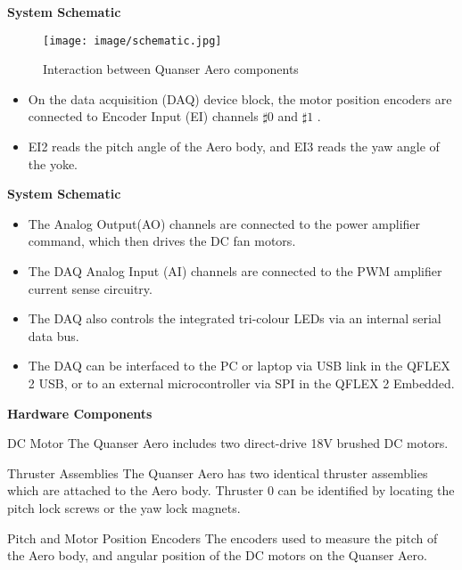 \documentclass[blue,mathserif,envcountsect,compress,10pt,xcolor=pdftex,dvipsnames,table]{beamer}
\begin{document}
\begin{frame}{\SquareShadowTopLeft \bf System Schematic}
\begin{figure}
  \centering
  \texttt{[image: image/schematic.jpg]}
  \caption{Interaction between Quanser Aero components}\label{schematic}
\end{figure}

\begin{itemize}
  \item On the data acquisition (DAQ) device block, the motor position encoders are connected to Encoder Input (EI) channels $\sharp 0$ and $\sharp 1$ .
  \item EI2 reads the pitch angle of the Aero body, and EI3 reads the yaw angle of the yoke.
\end{itemize}
\end{frame}


\begin{frame}{\SquareShadowTopLeft \bf System Schematic}
\begin{itemize}
  \item The Analog Output(AO) channels are connected to the power amplifier command, which then drives the DC fan motors.
  \item The DAQ Analog Input (AI) channels are connected to the PWM amplifier current sense circuitry.
  \item The DAQ also controls the integrated tri-colour LEDs via an internal serial data bus.\
  \item The DAQ can be interfaced to the PC or laptop via USB link in the QFLEX 2 USB, or to an external microcontroller via SPI in the QFLEX 2 Embedded.
\end{itemize}
\end{frame}


\begin{frame}{\SquareShadowTopLeft \bf Hardware Components}
\begin{block}{DC Motor}
The Quanser Aero includes two direct-drive 18V brushed DC motors.
\end{block}

\begin{block}{Thruster Assemblies}
The Quanser Aero has two identical thruster assemblies which are attached to the Aero body. Thruster 0 can be identified by locating the pitch lock screws or the yaw lock magnets.
\end{block}

\begin{block}{Pitch and Motor Position Encoders}
The encoders used to measure the pitch of the Aero body, and angular position of the DC motors on the Quanser Aero.
\end{block}

\end{frame}
\end{document}
